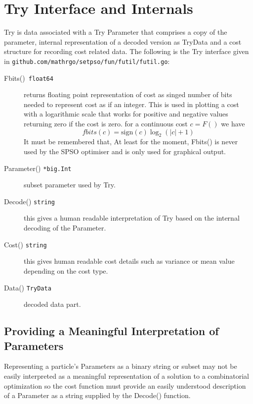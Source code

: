 \documentclass[a4paper,oneside,english]{book}
\numberwithin{equation}{section}
\numberwithin{figure}{section}
\newcommand{\codesorc}[1]{\texttt{github.com/mathrgo/setpso/#1}}
\begin{document}
\section{Try Interface and Internals}
Try is data associated with a Try Parameter that comprises a copy of the parameter, internal representation of a decoded version as TryData and a cost structure for recording cost related data.
The following is the Try interface given in \codesorc{fun/futil/futil.go}:
\begin{description}
	\item[Fbits()\texttt{ float64}] returns floating point representation of cost
	as singed number of bits needed to represent cost as if an integer. This is used in plotting a cost with a logarithmic scale that works for positive and negative values returning zero if the cost is zero.
	for a continuous cost $c=F()$ we have 
	\begin{equation}\label{eqn:fbits}
		fbits(c) = \mathrm{sign}(c)\log_2(|c|+1)
	\end{equation}
    It must be remembered that, At least for the moment, Fbits() is never used by the SPSO optimiser and is only used for graphical output. 
    
    \item[Parameter() \texttt{*big.Int}]  subset parameter used by Try.
    
    \item[Decode() \texttt{string}]  this  gives a human readable interpretation of Try based on the internal decoding of the Parameter.
    
    \item[Cost() \texttt{string}] this gives human readable cost details such as variance  or mean value depending on the cost type.
    
    \item[Data() \texttt{TryData}]  decoded data part.
\end{description}

\subsection{Providing a Meaningful Interpretation of Parameters}

Representing a particle's Parameters as a binary string or subset may not be
easily  interpreted  as a meaningful representation of a solution to a
combinatorial optimization so the cost function must provide an easily
understood description of a Parameter as a string supplied by the Decode()
function.
\end{document}
